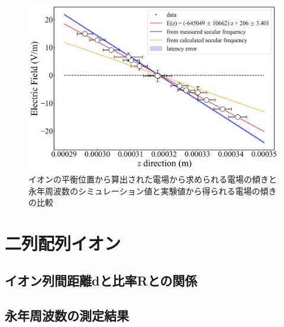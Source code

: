 \begin{figure}[h]
	\begin{center}
		\includegraphics[width = 0.6\linewidth]{./results/figure/COMP_DC3.jpg}
		\caption{イオンの平衡位置から算出された電場から求められる電場の傾きと永年周波数のシミュレーション値と実験値から得られる電場の傾きの比較}
		\label{fig:COMP_DC3}
	\end{center}
\end{figure}

%
\clearpage
%
\section{二列配列イオン}
\subsection{イオン列間距離dと比率Rとの関係}
\subsection{永年周波数の測定結果}

